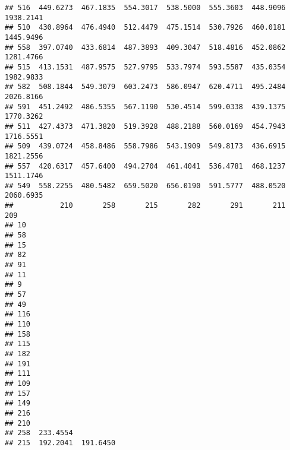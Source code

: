 \documentclass[
]{article}
\begin{document}
\begin{verbatim}
## 516  449.6273  467.1835  554.3017  538.5000  555.3603  448.9096 1938.2141
## 510  430.8964  476.4940  512.4479  475.1514  530.7926  460.0181 1445.9496
## 558  397.0740  433.6814  487.3893  409.3047  518.4816  452.0862 1281.4766
## 515  413.1531  487.9575  527.9795  533.7974  593.5587  435.0354 1982.9833
## 582  508.1844  549.3079  603.2473  586.0947  620.4711  495.2484 2026.8166
## 591  451.2492  486.5355  567.1190  530.4514  599.0338  439.1375 1770.3262
## 511  427.4373  471.3820  519.3928  488.2188  560.0169  454.7943 1716.5551
## 509  439.0724  458.8486  558.7986  543.1909  549.8173  436.6915 1821.2556
## 557  420.6317  457.6400  494.2704  461.4041  536.4781  468.1237 1511.1746
## 549  558.2255  480.5482  659.5020  656.0190  591.5777  488.0520 2060.6935
##           210       258       215       282       291       211       209
## 10                                                                       
## 58                                                                       
## 15                                                                       
## 82                                                                       
## 91                                                                       
## 11                                                                       
## 9                                                                        
## 57                                                                       
## 49                                                                       
## 116                                                                      
## 110                                                                      
## 158                                                                      
## 115                                                                      
## 182                                                                      
## 191                                                                      
## 111                                                                      
## 109                                                                      
## 157                                                                      
## 149                                                                      
## 216                                                                      
## 210                                                                      
## 258  233.4554                                                            
## 215  192.2041  191.6450                                                  

\end{verbatim}
\end{document}
